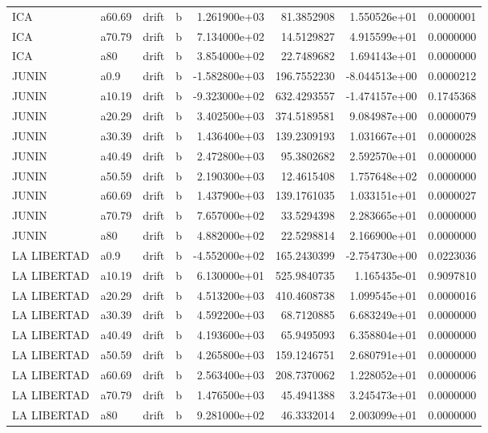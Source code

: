 \documentclass[
]{article}
\begin{document}
\begin{table}[!h]
\begin{tabular}[t]{llllrrrr}
\addlinespace
ICA & a60.69 & drift & b & 1.261900e+03 & 81.3852908 & 1.550526e+01 & 0.0000001\\
ICA & a70.79 & drift & b & 7.134000e+02 & 14.5129827 & 4.915599e+01 & 0.0000000\\
ICA & a80 & drift & b & 3.854000e+02 & 22.7489682 & 1.694143e+01 & 0.0000000\\
JUNIN & a0.9 & drift & b & -1.582800e+03 & 196.7552230 & -8.044513e+00 & 0.0000212\\
JUNIN & a10.19 & drift & b & -9.323000e+02 & 632.4293557 & -1.474157e+00 & 0.1745368\\
\addlinespace
JUNIN & a20.29 & drift & b & 3.402500e+03 & 374.5189581 & 9.084987e+00 & 0.0000079\\
JUNIN & a30.39 & drift & b & 1.436400e+03 & 139.2309193 & 1.031667e+01 & 0.0000028\\
JUNIN & a40.49 & drift & b & 2.472800e+03 & 95.3802682 & 2.592570e+01 & 0.0000000\\
JUNIN & a50.59 & drift & b & 2.190300e+03 & 12.4615408 & 1.757648e+02 & 0.0000000\\
JUNIN & a60.69 & drift & b & 1.437900e+03 & 139.1761035 & 1.033151e+01 & 0.0000027\\
\addlinespace
JUNIN & a70.79 & drift & b & 7.657000e+02 & 33.5294398 & 2.283665e+01 & 0.0000000\\
JUNIN & a80 & drift & b & 4.882000e+02 & 22.5298814 & 2.166900e+01 & 0.0000000\\
LA LIBERTAD & a0.9 & drift & b & -4.552000e+02 & 165.2430399 & -2.754730e+00 & 0.0223036\\
LA LIBERTAD & a10.19 & drift & b & 6.130000e+01 & 525.9840735 & 1.165435e-01 & 0.9097810\\
LA LIBERTAD & a20.29 & drift & b & 4.513200e+03 & 410.4608738 & 1.099545e+01 & 0.0000016\\
\addlinespace
LA LIBERTAD & a30.39 & drift & b & 4.592200e+03 & 68.7120885 & 6.683249e+01 & 0.0000000\\
LA LIBERTAD & a40.49 & drift & b & 4.193600e+03 & 65.9495093 & 6.358804e+01 & 0.0000000\\
LA LIBERTAD & a50.59 & drift & b & 4.265800e+03 & 159.1246751 & 2.680791e+01 & 0.0000000\\
LA LIBERTAD & a60.69 & drift & b & 2.563400e+03 & 208.7370062 & 1.228052e+01 & 0.0000006\\
LA LIBERTAD & a70.79 & drift & b & 1.476500e+03 & 45.4941388 & 3.245473e+01 & 0.0000000\\
\addlinespace
LA LIBERTAD & a80 & drift & b & 9.281000e+02 & 46.3332014 & 2.003099e+01 & 0.0000000\\

\end{tabular}
\end{table}
\end{document}
